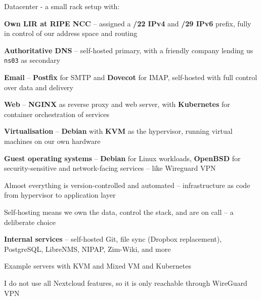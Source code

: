 \documentclass[Screen16to9,17pt]{foils}
\begin{document}
Datacenter - a small rack setup with:
\begin{list2}
\item {\bf Own LIR at RIPE NCC} -- assigned a {\bf /22 IPv4} and {\bf /29 IPv6} prefix,
fully in control of our address space and routing
\item {\bf Authoritative DNS} -- self-hosted primary, with a friendly company
lending us \verb+ns03+ as secondary
\item {\bf Email} -- {\bf Postfix} for SMTP and {\bf Dovecot} for IMAP,
self-hosted with full control over data and delivery
\item {\bf Web} -- {\bf NGINX} as reverse proxy and web server,
with {\bf Kubernetes} for container orchestration of services
\item {\bf Virtualisation} -- {\bf Debian} with {\bf KVM} as the hypervisor,
running virtual machines on our own hardware
\item {\bf Guest operating systems} -- {\bf Debian} for Linux workloads,
{\bf OpenBSD} for security-sensitive and network-facing services -- like Wireguard VPN
\item Almost everything is version-controlled and automated -- infrastructure as code
from hypervisor to application layer
\item Self-hosting means we own the data, control the stack,
and are on call -- a deliberate choice
\item {\bf Internal services} -- self-hosted Git, file sync (Dropbox replacement),
PostgreSQL, LibreNMS, NIPAP, Zim-Wiki, and more
\end{list2}


Example servers with KVM and Mixed VM and Kubernetes


I do not use all Nextcloud features, so it is only reachable through WireGuard VPN

\end{document}
